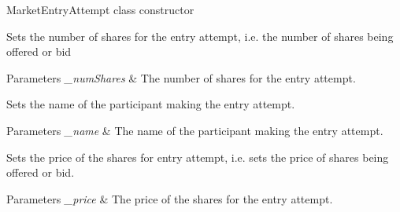 
\begin{DoxyRefList}
\item[\label{todo__todo000001}%
\hypertarget{todo__todo000001}{}%
Member \hyperlink{classfinancialmarketsimulator_1_1_market_entry_attempt_a9b2f8a9eef7975bc053907e2ea05c779}{financialmarketsimulator.Market\+Entry\+Attempt.Market\+Entry\+Attempt} (double pr, int num\+Shares, String name)]Market\+Entry\+Attempt class constructor 
\item[\label{todo__todo000003}%
\hypertarget{todo__todo000003}{}%
Member \hyperlink{classfinancialmarketsimulator_1_1_market_entry_attempt_a27476573fd4a0aa03270c648500a3c98}{financialmarketsimulator.Market\+Entry\+Attempt.set\+Number\+Of\+Shares} (int \+\_\+num\+Shares)]Sets the number of shares for the entry attempt, i.\+e. the number of shares being offered or bid 
\begin{DoxyParams}{Parameters}
{\em \+\_\+num\+Shares} & The number of shares for the entry attempt.  \\
\hline
\end{DoxyParams}

\item[\label{todo__todo000004}%
\hypertarget{todo__todo000004}{}%
Member \hyperlink{classfinancialmarketsimulator_1_1_market_entry_attempt_af2b5d63e0ac8d2e39cf474e128739c8a}{financialmarketsimulator.Market\+Entry\+Attempt.set\+Participant\+Name} (String \+\_\+name)]Sets the name of the participant making the entry attempt. 
\begin{DoxyParams}{Parameters}
{\em \+\_\+name} & The name of the participant making the entry attempt.  \\
\hline
\end{DoxyParams}

\item[\label{todo__todo000002}%
\hypertarget{todo__todo000002}{}%
Member \hyperlink{classfinancialmarketsimulator_1_1_market_entry_attempt_ac350f88eed14da376cb58aa920df2f38}{financialmarketsimulator.Market\+Entry\+Attempt.set\+Price} (double \+\_\+price)]Sets the price of the shares for entry attempt, i.\+e. sets the price of shares being offered or bid. 
\begin{DoxyParams}{Parameters}
{\em \+\_\+price} & The price of the shares for the entry attempt. \\
\hline
\end{DoxyParams}

\end{DoxyRefList}